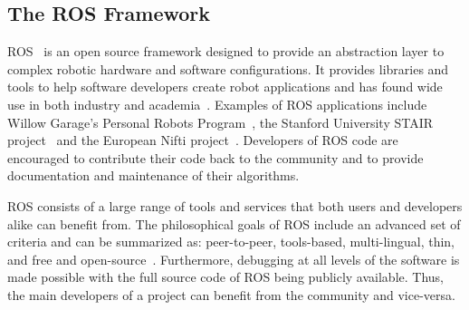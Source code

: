 \subsection*{The ROS Framework}
ROS~\cite{Quigley2009} is an open source framework designed to provide an abstraction layer to complex robotic hardware and software configurations. It provides libraries and tools to help software developers create robot applications and has found wide use in both industry and academia~\cite{IsRosGood}. Examples of ROS applications include
Willow Garage's Personal Robots Program~\cite{WYOBEK.ICRA.2008}, the Stanford University STAIR project~\cite{quigley2007stair} and the European Nifti project~\cite{larochelle2011establishing}. Developers of ROS code are encouraged to
contribute their code back to the community and to provide documentation and maintenance of their algorithms.

ROS consists of a large range of tools and services that both users and developers alike can benefit from. The philosophical goals of ROS include an advanced set of criteria and can be summarized as: peer-to-peer, tools-based, multi-lingual, thin, and free and open-source~\cite{Quigley2009}. Furthermore, debugging at all levels of the software is made possible with the full source code of ROS being publicly available. Thus, the main developers of a project can benefit from the community and vice-versa.

